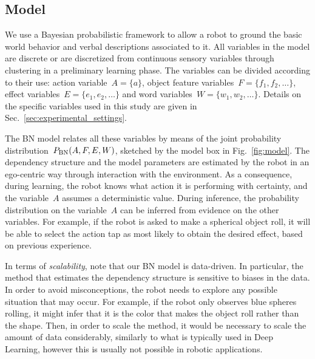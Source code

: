 \subsection{\AffWords{} Model}
\label{sec:bn}
We use a Bayesian probabilistic framework to allow a robot to ground the basic world behavior and verbal descriptions associated to it.
All variables in the model are discrete or are discretized from continuous sensory variables through clustering in a preliminary learning phase.
The variables can be divided according to their use: action variable~$A = \{a\}$, object feature variables~$F=\{f_1, f_2, \dots\}$, effect variables~$E=\{e_1, e_2, \dots\}$ and word variables~$W = \{w_1, w_2, \dots\}$.
Details on the specific variables used in this study are given in Sec.~\ref{sec:experimental_settings}.

The \ac{BN} model relates all these variables by means of the joint probability distribution~$P_{\text{BN}}(A, F, E, W)$, sketched by the \AffWords{} model box in Fig.~\ref{fig:model}.
The dependency structure and the model parameters are estimated by the robot in an ego-centric way through interaction with the environment.
As a consequence, during learning, the robot knows what action it is performing with certainty, and the variable~$A$ assumes a deterministic value.
During inference, the probability distribution on the variable~$A$ can be inferred from evidence on the other variables.
For example, if the robot is asked to make a spherical object roll, it will be able to select the action tap as most likely to obtain the desired effect, based on previous experience.

In terms of \emph{scalability}, note that our \ac{BN} model is data-driven.
In particular, the method that estimates the dependency structure is sensitive to biases in the data.
In order to avoid misconceptions, the robot needs to explore any possible situation that may occur.
For example, if the robot only observes blue spheres rolling, it might infer that it is the color that makes the object roll rather than the shape.
Then, in order to scale the method, it would be necessary to scale the amount of data considerably, similarly to what is typically used in Deep Learning, however this is usually not possible in robotic applications.

\newcommand{\myscalefactor}{0.8}

\newcommand{\shapeOfHmmState}{circle} %

\newcommand{\standardhmm}[1]{
    \node[draw,\shapeOfHmmState] (hmm#1s1) {$s_1$};
    \node[draw,\shapeOfHmmState, right of=hmm#1s1] (hmm#1s2) {$s_2$};
    \node[\shapeOfHmmState, right of=hmm#1s2] (hmm#1s3) {\dots};
    \node[draw,\shapeOfHmmState, right of=hmm#1s3] (hmm#1s4) {$s_Q$};
    \node[left of=hmm#1s1]  (invisible1) {};
    \node[right of=hmm#1s4] (invisible2) {};
    \path[->] (hmm#1s1) edge (hmm#1s2);
    \path[loop above] (hmm#1s1) edge (hmm#1s1);
    \path[->] (hmm#1s2) edge (hmm#1s3);
    \path[loop above] (hmm#1s2) edge (hmm#1s2);
    \path[dashed] (hmm#1s2) -- (hmm#1s3);
    \path[->] (hmm#1s3) edge (hmm#1s4);
    \path[loop above] (hmm#1s4) edge (hmm#1s4);
    \path[->] (invisible1) edge (hmm#1s1);
    \path[->] (hmm#1s4) edge (invisible2);
}

